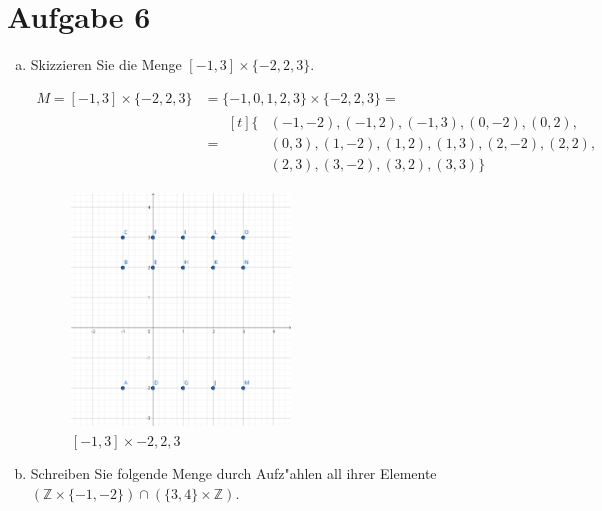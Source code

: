 \section{Aufgabe 6}
\setcounter{section}{6}

\begin{enumerate}[(a)]
    \item Skizzieren Sie die Menge $[-1, 3] \times \{-2,2,3\}$.

        \begin{align*}
            M = [-1, 3] \times \{-2,2,3\} &= \{-1, 0, 1, 2, 3\} \times \{-2, 2, 3\} = \\
                                          &=
                    \begin{aligned}[t]
                        \{&(-1, -2), (-1, 2), (-1, 3), (0, -2), (0, 2),\\
                          &(0, 3), (1, -2), (1, 2), (1, 3), (2, -2), (2, 2),\\
                          &(2, 3), (3, -2), (3, 2), (3, 3)\}
                    \end{aligned}
        \end{align*}

        \begin{figure}[h]
            \centering
            \includegraphics[width=0.55\textwidth]{./assets/abbildung-06-01.png}
            \caption{$[-1,3] \times {-2,2,3}$}
        \end{figure}

    \pagebreak

    \item Schreiben Sie folgende Menge durch Aufz"ahlen all ihrer Elemente
        $(\mathbb{Z} \times \{-1, -2\}) \cap (\{3, 4\} \times \mathbb{Z})$.


\end{enumerate}
